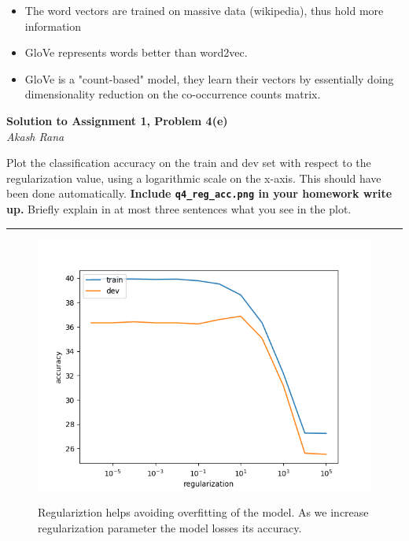 \documentclass[letter,12pt]{article}
\newcommand{\myhwtitle}[3]
{\begin{center}
{\large {\bf Solution to Assignment {#1}, Problem {#2}}}\\
\medskip
{\it {#3}} %
\end{center}}
\newcommand{\solutionsAuthor}{Akash Rana}
\begin{document}
\begin{itemize}
\item The word vectors are trained on massive data (wikipedia), thus hold more
    information
\item GloVe represents words better than word2vec.
\item GloVe is a "count-based" model, they learn their vectors by essentially doing dimensionality reduction on the co-occurrence counts matrix.
\end{itemize}

\clearpage

\myhwtitle{1}{4(e)}{\solutionsAuthor}

\bigskip
\noindent Plot the classification accuracy on the train and dev set with respect to the regularization value, using a logarithmic scale on the x-axis. This should have been done automatically. \textbf{Include \texttt{q4\_reg\_acc.png} in your homework write up.} Briefly explain in at most three sentences what you see in the plot.\vspace{5mm}

\noindent\rule{\textwidth}{0.4pt}\vspace{5mm}

\begin{figure}[!h!p]
\begin{center}
\includegraphics[scale=0.5]{../q4_reg_v_acc.png}
\end{center}
Regulariztion helps avoiding overfitting of the model.
As we increase regularization parameter the model losses its accuracy.
\end{figure}
\end{document}
